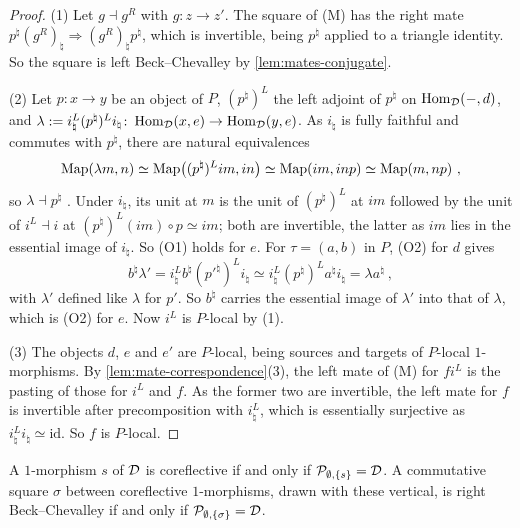\begin{proof}
%
(1) Let
$g \dashv g^{R}$
with $g\colon z \to z'$. The square of (M) has the right mate
$p^{\natural}(g^{R})_{\natural} \Rightarrow (g^{R})_{\natural}p^{\natural}$,
which is invertible, being $p^{\natural}$ applied to a triangle identity. So the
square is left Beck--Chevalley by \cref{lem:mates-conjugate}.

(2) Let $p\colon x \to y$ be an object of $P$, $(p^{\natural})^{L}$ the left
adjoint of $p^{\natural}$ on $\operatorname{Hom}_{\mathcal{D}}(-,d)$, and
$\lambda := i^{L}_{\natural}(p^{\natural})^{L}i_{\natural}\colon
\operatorname{Hom}_{\mathcal{D}}(x,e) \to \operatorname{Hom}_{\mathcal{D}}(y,e)$.
As $i_{\natural}$ is fully faithful and commutes with $p^{\natural}$, there
are natural equivalences
\begin{equation*}
\operatorname{Map}(\lambda m,n) \simeq \operatorname{Map}\bigl((p^{\natural})^{L}im,in\bigr) \simeq
\operatorname{Map}(im,inp) \simeq \operatorname{Map}(m,np) \ ,
\end{equation*}
so
$\lambda \dashv p^{\natural}$
\cite[Prop.~5.2.2.8]{htt}. Under $i_{\natural}$,
its unit at $m$ is the unit of $(p^{\natural})^{L}$ at $im$ followed by the unit
of
$i^{L} \dashv i$
at
$(p^{\natural})^{L}(im) \circ p \simeq im$;
both are invertible, the latter as $im$ lies in the essential image of
$i_{\natural}$. So (O1) holds for $e$. For $\tau = (a,b)$ in $P$, (O2) for $d$
gives
\begin{equation*}
b^{\natural}\lambda' =
i^{L}_{\natural}b^{\natural}(p'^{\natural})^{L}i_{\natural}
\simeq i^{L}_{\natural}(p^{\natural})^{L}a^{\natural}i_{\natural} = \lambda
a^{\natural} \ ,
\end{equation*}
with $\lambda'$ defined like $\lambda$ for $p'$. So $b^{\natural}$ carries the
essential image of $\lambda'$ into that of $\lambda$, which is (O2) for $e$.
Now $i^{L}$ is $P$-local by (1).

(3) The objects $d$, $e$ and $e'$ are $P$-local, being sources and targets of
$P$-local $1$-morphisms. By \cref{lem:mate-correspondence}(3),
the left mate of (M) for $fi^{L}$ is the
pasting of those for $i^{L}$ and $f$. As the former two are invertible, the
left mate for $f$ is invertible after precomposition with $i^{L}_{\natural}$,
which is essentially surjective as
$i^{L}_{\natural}i_{\natural} \simeq \mathrm{id}$.
So $f$ is $P$-local.
\end{proof}

\begin{lem}
\label{lem:laxloc-repr}
%
A $1$-morphism $s$ of $\mathcal{D}$ is coreflective if and only if
$\mathcal{P}_{\emptyset,\{s\}} = \mathcal{D}$.
A commutative square $\sigma$ between coreflective $1$-morphisms, drawn with
these vertical, is right Beck--Chevalley if and only if
$\mathcal{P}_{\emptyset,\{\sigma\}} = \mathcal{D}$.
\end{lem}

